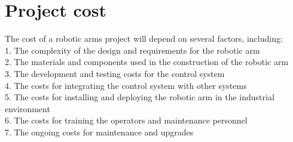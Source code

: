 \section{Project cost}
The cost of a robotic arms project will depend on several factors, including:\\
1. The complexity of the design and requirements for the robotic arm\\
2. The materials and components used in the construction of the robotic arm\\
3. The development and testing costs for the control system\\
4. The costs for integrating the control system with other systems\\
5. The costs for installing and deploying the robotic arm in the industrial environment\\
6. The costs for training the operators and maintenance personnel\\
7. The ongoing costs for maintenance and upgrades \\
